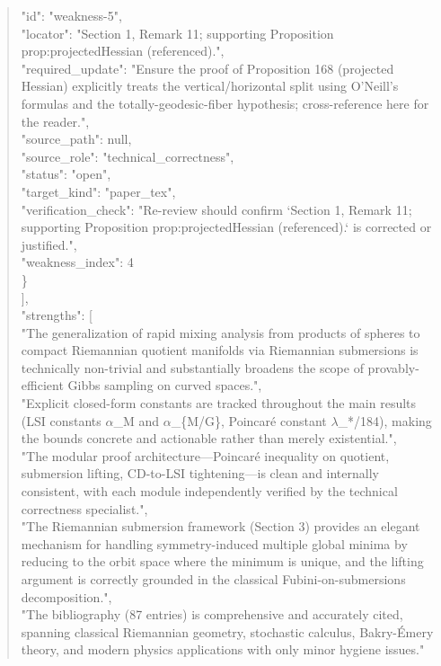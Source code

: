 \documentclass[11pt]{article}
\begin{document}
\begin{quote}
      "id": "weakness-5",\\
      "locator": "Section 1, Remark 11; supporting Proposition prop:projectedHessian (referenced).",\\
      "required\_update": "Ensure the proof of Proposition 168 (projected Hessian) explicitly treats the vertical/horizontal split using O'Neill's formulas and the totally-geodesic-fiber hypothesis; cross-reference here for the reader.",\\
      "source\_path": null,\\
      "source\_role": "technical\_correctness",\\
      "status": "open",\\
      "target\_kind": "paper\_tex",\\
      "verification\_check": "Re-review should confirm `Section 1, Remark 11; supporting Proposition prop:projectedHessian (referenced).` is corrected or justified.",\\
      "weakness\_index": 4\\
    \}\\
  ],\\
  "strengths": [\\
    "The generalization of rapid mixing analysis from products of spheres to compact Riemannian quotient manifolds via Riemannian submersions is technically non-trivial and substantially broadens the scope of provably-efficient Gibbs sampling on curved spaces.",\\
    "Explicit closed-form constants are tracked throughout the main results (LSI constants \ensuremath{\alpha}\_M and \ensuremath{\alpha}\_\{M/G\}, Poincaré constant \ensuremath{\lambda}\_*/184), making the bounds concrete and actionable rather than merely existential.",\\
    "The modular proof architecture---Poincaré inequality on quotient, submersion lifting, CD-to-LSI tightening---is clean and internally consistent, with each module independently verified by the technical correctness specialist.",\\
    "The Riemannian submersion framework (Section 3) provides an elegant mechanism for handling symmetry-induced multiple global minima by reducing to the orbit space where the minimum is unique, and the lifting argument is correctly grounded in the classical Fubini-on-submersions decomposition.",\\
    "The bibliography (87 entries) is comprehensive and accurately cited, spanning classical Riemannian geometry, stochastic calculus, Bakry-Émery theory, and modern physics applications with only minor hygiene issues."\\

\end{quote}
\end{document}

